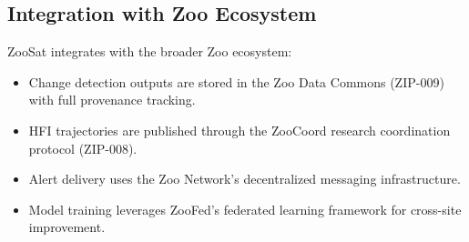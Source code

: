 \subsection{Integration with Zoo Ecosystem}

ZooSat integrates with the broader Zoo ecosystem:
\begin{itemize}[leftmargin=*]
    \item Change detection outputs are stored in the Zoo Data Commons (ZIP-009) with full provenance tracking.
    \item HFI trajectories are published through the ZooCoord research coordination protocol (ZIP-008).
    \item Alert delivery uses the Zoo Network's decentralized messaging infrastructure.
    \item Model training leverages ZooFed's federated learning framework for cross-site improvement.
\end{itemize}

